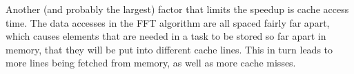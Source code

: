 Another (and probably the largest) factor that limits the speedup is cache access time. The data accesses in the FFT algorithm are all spaced fairly far apart, which causes elements that are needed in a task to be stored so far apart in memory,
that they will be put into different cache lines. This in turn leads to more lines being fetched from memory, as well as more cache misses.
